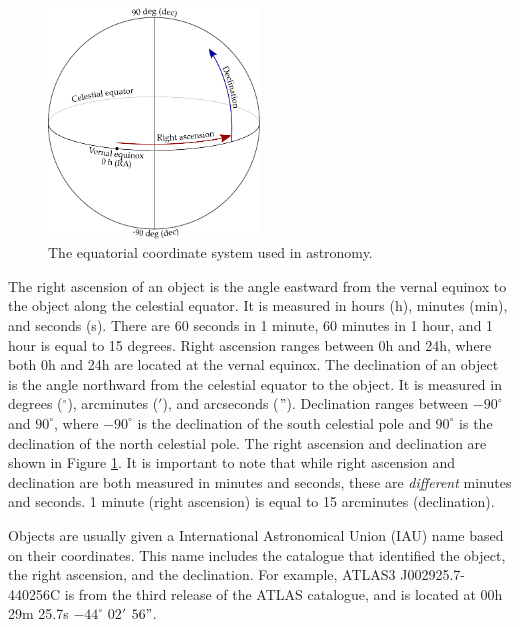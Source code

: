             \begin{figure}[!ht]
                \centering
                \includegraphics[width=0.5\textwidth]{images/ra-dec}
                \caption{The equatorial coordinate system used in astronomy.}
                \label{fig:equatorial-coordinates}
            \end{figure}

            The right ascension of an object is the angle eastward from the
            vernal equinox to the object along the celestial equator. It is
            measured in hours (h), minutes (min), and seconds (s). There are 60
            seconds in 1 minute, 60 minutes in 1 hour, and 1 hour is equal to 15
            degrees. Right ascension ranges between 0h and 24h, where both 0h
            and 24h are located at the vernal equinox. The declination of an
            object is the angle northward from the celestial equator to the
            object. It is measured in degrees (${}^\circ$), arcminutes ($'$),
            and arcseconds ($"$). Declination ranges between $-90^\circ$ and
            $90^\circ$, where $-90^\circ$ is the declination of the south
            celestial pole and $90^\circ$ is the declination of the north
            celestial pole. The right ascension and declination are shown in
            Figure \ref{fig:equatorial-coordinates}. It is important to note
            that while right ascension and declination are both measured in
            minutes and seconds, these are \emph{different} minutes and seconds.
            1 minute (right ascension) is equal to 15 arcminutes (declination).

            Objects are usually given a International Astronomical Union (IAU)
            name based on their coordinates. This name includes the catalogue
            that identified the object, the right ascension, and the
            declination. For example, ATLAS3 J002925.7-440256C is from the third
            release of the ATLAS catalogue, and is located at 00h 29m 25.7s
            $-44^\circ$ $02'$ $56"$.

